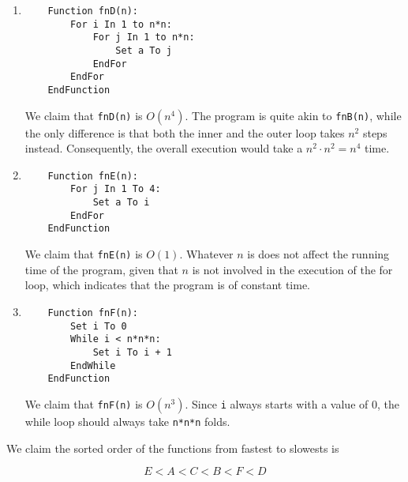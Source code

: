 \documentclass{article}
\begin{document}
\begin{enumerate}[label=\Alph*]
    \newpage

    \item \begin{lstlisting}
    Function fnD(n):
        For i In 1 to n*n:
            For j In 1 to n*n:
                Set a To j
            EndFor
        EndFor
    EndFunction
    \end{lstlisting}

    We claim that \lstinline|fnD(n)| is $O(n^4)$. The program is quite akin to \lstinline|fnB(n)|, while the only difference is that both the inner and the outer loop takes $n^2$ steps instead. Consequently, the overall execution would take a $n^2 \cdot n^2=n^4$ time.


    \item \begin{lstlisting}
    Function fnE(n):
        For j In 1 To 4:
            Set a To i
        EndFor
    EndFunction
    \end{lstlisting}

    We claim that \lstinline|fnE(n)| is $O(1)$. Whatever $n$ is does not affect the running time of the program, given that $n$ is not involved in the execution of the for loop, which indicates that the program is of constant time. 

    \item \begin{lstlisting}
    Function fnF(n):
        Set i To 0
        While i < n*n*n:
            Set i To i + 1
        EndWhile
    EndFunction
    \end{lstlisting}

    We claim that \lstinline|fnF(n)| is $O(n^3)$. Since \lstinline|i| always starts with a value of $0$, the while loop should always take \lstinline|n*n*n| folds.
\end{enumerate}



    We claim the sorted order of the functions from fastest to slowests is

    $$
    E<A<C<B<F<D
    $$
    
\end{document}
